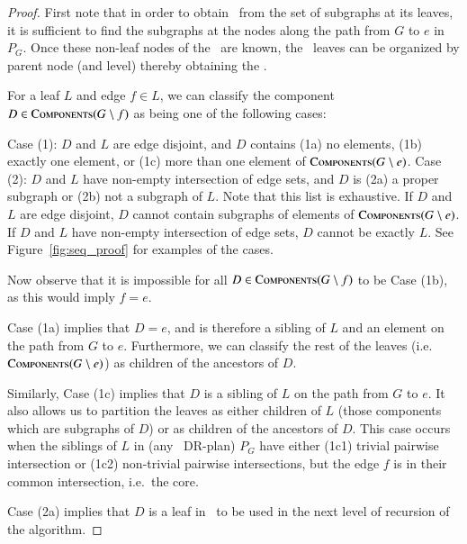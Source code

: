 
\begin{proof}
    First note that in order to obtain \branchGePG\ from the set of subgraphs at its leaves, it is sufficient to find the subgraphs at the nodes along the path from $G$ to $e$ in $P_G$. Once these non-leaf nodes of the \branch\ are known, the \branch\ leaves can be organized by parent node (and level) thereby obtaining the \branch.

    For a leaf $L$ and edge $f\in L$, we can classify the component $D\in \textsc{Components}(G\setminus f)$ as being one of the following cases:

    Case (1):
    $D$ and $L$ are edge disjoint, and $D$ contains
    (1a) no elements,
    (1b) exactly one element, or
    (1c) more than one element
    of $\textsc{Components}(G\setminus e)$.
    Case (2):
    $D$ and $L$ have non-empty intersection of edge sets, and $D$ is
    (2a)
    a proper subgraph or
    (2b)
    not a subgraph
    of $L$.
    Note that this list is exhaustive. If $D$ and $L$ are edge disjoint, $D$ cannot contain subgraphs of elements of $\textsc{Components}(G\setminus e)$. If $D$ and $L$ have non-empty intersection of edge sets, $D$ cannot be exactly $L$.
    See Figure~\ref{fig:seq_proof} for examples of the cases.

    Now observe that it is impossible for all $D\in \textsc{Components}(G\setminus f)$ to be Case (1b), as this would imply $f=e$.

    Case (1a) implies that $D=e$, and is therefore a sibling of $L$ and an element on the path from $G$ to $e$. Furthermore, we can classify the rest of the leaves (i.e.\ $\textsc{Components}(G\setminus e)$) as children of the ancestors of $D$.

    Similarly, Case (1c) implies that $D$ is a sibling of $L$ on the path from $G$ to $e$. It also allows us to partition the leaves as either children of $L$ (those components which are subgraphs of $D$) or as children of the ancestors of $D$. This case occurs when the siblings of $L$ in (any \pseudosequential\ DR-plan) $P_G$ have either (1c1) trivial pairwise intersection or (1c2) non-trivial pairwise intersections, but the edge $f$ is in their common intersection, i.e.\ the core.

    Case (2a) implies that $D$ is a leaf in \branchLfPL\ to be used in the next level of recursion of the algorithm.


\end{proof}
